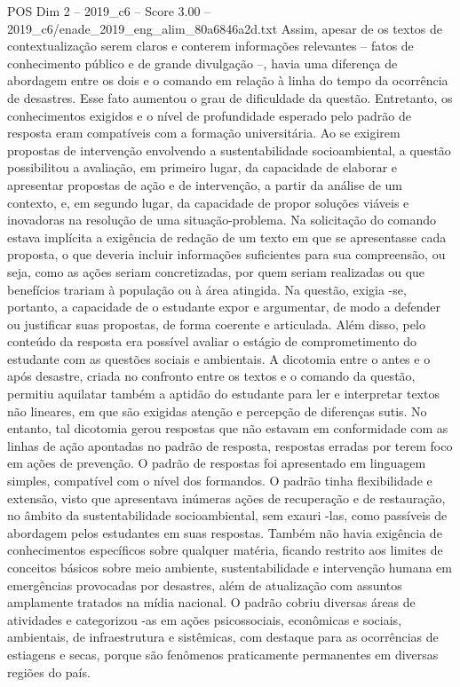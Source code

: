 \begin{textsample}{POS Dim 2 – 2019\_c6 – Score 3.00 – 2019\_c6/enade\_2019\_eng\_alim\_80a6846a2d.txt}
Assim, apesar de os textos de contextualização serem claros e conterem informações relevantes – fatos de conhecimento público e de grande divulgação –, havia uma diferença de abordagem entre os dois e o comando em relação à linha do tempo da ocorrência de desastres.
Esse fato aumentou o grau de dificuldade da questão.
Entretanto, os conhecimentos exigidos e o nível de profundidade esperado pelo padrão de resposta eram compatíveis com a formação universitária.
Ao se exigirem propostas de intervenção envolvendo a sustentabilidade socioambiental, a questão possibilitou a avaliação, em primeiro lugar, da capacidade de elaborar e apresentar propostas de ação e de intervenção, a partir da análise de um contexto, e, em segundo lugar, da capacidade de propor soluções viáveis e inovadoras na resolução de uma situação-problema.
Na solicitação do comando estava implícita a exigência de redação de um texto em que se apresentasse cada proposta, o que deveria incluir informações suficientes para sua compreensão, ou seja, como as ações seriam concretizadas, por quem seriam realizadas ou que benefícios trariam à população ou à área atingida.
Na questão, exigia -se, portanto, a capacidade de o estudante expor e argumentar, de modo a defender ou justificar suas propostas, de forma coerente e articulada.
Além disso, pelo conteúdo da resposta era possível avaliar o estágio de comprometimento do estudante com as questões sociais e ambientais.
A dicotomia entre o antes e o após desastre, criada no confronto entre os textos e o comando da questão, permitiu aquilatar também a aptidão do estudante para ler e interpretar textos não lineares, em que são exigidas atenção e percepção de diferenças sutis.
No entanto, tal dicotomia gerou respostas que não estavam em conformidade com as linhas de ação apontadas no padrão de resposta, respostas erradas por terem foco em ações de prevenção.
O padrão de respostas foi apresentado em linguagem simples, compatível com o nível dos formandos.
O padrão tinha flexibilidade e extensão, visto que apresentava inúmeras ações de recuperação e de restauração, no âmbito da sustentabilidade socioambiental, sem exauri -las, como passíveis de abordagem pelos estudantes em suas respostas.
Também não havia exigência de conhecimentos específicos sobre qualquer matéria, ficando restrito aos limites de conceitos básicos sobre meio ambiente, sustentabilidade e intervenção humana em emergências provocadas por desastres, além de atualização com assuntos amplamente tratados na mídia nacional.
O padrão cobriu diversas áreas de atividades e categorizou -as em ações psicossociais, econômicas e sociais, ambientais, de infraestrutura e sistêmicas, com destaque para as ocorrências de estiagens e secas, porque são fenômenos praticamente permanentes em diversas regiões do país.

\end{textsample}

